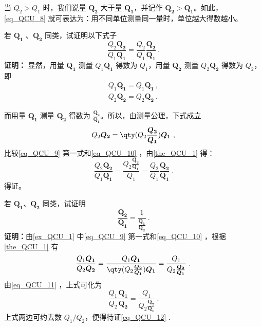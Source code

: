 当 $Q_2>Q_1$ 时，我们说量 $\boldsymbol{Q_2}$ 大于量 $\boldsymbol{Q_1}$，并记作 $\boldsymbol{Q_2}>\boldsymbol{Q_1}$。如此，\autoref{eq_QCU_8} 就可表达为：用不同单位测量同一量时，单位越大得数越小。
\begin{example}{}\label{ex_QCU_1}
若 $\boldsymbol{Q_1}$ 、$\boldsymbol{Q_2}$ 同类，试证明以下式子
\begin{equation}\label{eq_QCU_11}
\frac{Q_2\boldsymbol{Q_2}}{Q_1\boldsymbol{Q_1}}=\frac{Q_2}{Q_1}\frac{\boldsymbol{Q_2}}{\boldsymbol{Q_1}}~.
\end{equation}
\textbf{证明：} 显然，用量 $\boldsymbol{Q_1}$ 测量 $Q_1\boldsymbol{Q_1}$ 得数为 $Q_1$，用量 $\boldsymbol{Q_2}$ 测量 $Q_2\boldsymbol{Q_2}$ 得数为 $Q_2$，即
\begin{equation}\label{eq_QCU_9}
\begin{aligned}
Q_1\boldsymbol{Q_1}=Q_1\boldsymbol{Q_1}~,\\
Q_2\boldsymbol{Q_2}=Q_2\boldsymbol{Q_2}~.
\end{aligned}
\end{equation}


而用量 $\boldsymbol{Q_1}$ 测量 $\boldsymbol{Q_2}$ 得数为 $\frac{\boldsymbol{Q_2}}{\boldsymbol{Q_1}}$。所以，由测量公理，下式成立
\begin{equation}\label{eq_QCU_10}
Q_2\boldsymbol{Q_2}=\qty(Q_2\frac{\boldsymbol{Q_2}}{\boldsymbol{Q_1}})\boldsymbol{Q_1}~,
\end{equation}
比较\autoref{eq_QCU_9} 第一式和\autoref{eq_QCU_10} ，由\autoref{the_QCU_1} 得：
\begin{equation}
\frac{Q_2\boldsymbol{Q_2}}{Q_1\boldsymbol{Q_1}}=\frac{Q_2\frac{\boldsymbol{Q_2}}{\boldsymbol{Q_1}}}{Q_1}=\frac{Q_2}{Q_1}\frac{\boldsymbol{Q_2}}{\boldsymbol{Q_1}}~.
\end{equation}
得证。
\end{example}
\begin{example}{}\label{ex_QCU_2}
若 $\boldsymbol{Q_1}$、$\boldsymbol{Q_2}$ 同类，试证明
\begin{equation}\label{eq_QCU_12}
\frac{\boldsymbol{Q_2}}{\boldsymbol{{Q_1}}}=\frac{1}{\frac{\boldsymbol{Q_1}}{\boldsymbol{Q_2}}}~.
\end{equation}
\textbf{证明：}由\autoref{ex_QCU_1} 中\autoref{eq_QCU_9} 第一式和\autoref{eq_QCU_10} ，根据\autoref{the_QCU_1} 有
\begin{equation}
\frac{Q_1\boldsymbol{Q_1}}{Q_2\boldsymbol{Q_2}}=\frac{Q_1\boldsymbol{Q_1}}{\qty(Q_2\frac{\boldsymbol{Q_2}}{\boldsymbol{Q_1}})\boldsymbol{Q_1}}=\frac{Q_1}{Q_2\frac{\boldsymbol{Q_2}}{\boldsymbol{Q_1}}}~.
\end{equation}
由\autoref{eq_QCU_11} ，上式可化为
\begin{equation}
\frac{Q_1}{Q_2}\frac{\boldsymbol{Q_1}}{\boldsymbol{Q_2}}=\frac{Q_1}{Q_2\frac{\boldsymbol{Q_2}}{\boldsymbol{Q_1}}}~.
\end{equation}
上式两边可约去数 $Q_1/Q_2$，便得待证\autoref{eq_QCU_12} .
\end{example}
